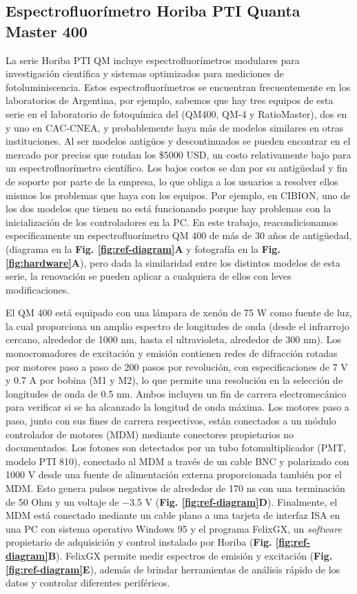 \subsection{Espectrofluorímetro Horiba PTI Quanta Master 400}

La serie Horiba PTI QM incluye espectrofluorímetros modulares para investigación científica y sistemas optimizados para mediciones de fotoluminiscencia.
Estos espectrofluorímetros se encuentran frecuentemente en los laboratorios de Argentina, por ejemplo, sabemos que hay tres equipos de esta serie en el laboratorio de fotoquímica del  (QM400, QM-4 y RatioMaster), dos en  y uno en CAC-CNEA, y probablemente haya más de modelos similares en otras instituciones.
Al ser modelos antigüos y descontinuados se pueden encontrar en el mercado por precios que rondan los \$5000 USD, un costo relativamente bajo para un espectrofluorímetro científico.
Los bajos costos se dan por su antigüedad y fin de soporte por parte de la empresa, lo que obliga a los usuarios a resolver ellos mismos los problemas que haya con los equipos.
Por ejemplo, en CIBION, uno de los dos modelos que tienen no está funcionando porque hay problemas con la inicialización de los controladores en la PC.
En este trabajo, reacondicionamos específicamente un espectrofluorímetro QM 400 de más de 30 años de antigüedad,  (diagrama en la \textbf{Fig. \ref{fig:ref-diagram}A} y fotografía en la \textbf{Fig. \ref{fig:hardware}A}), pero dada la similaridad entre los distintos modelos de esta serie, la renovación se pueden aplicar a cualquiera de ellos con leves modificaciones. 

El QM 400 está equipado con una lámpara de xenón de 75 W como fuente de luz, la cual proporciona un amplio espectro de longitudes de onda (desde el infrarrojo cercano, alrededor de 1000 nm, hasta el ultravioleta, alrededor de 300 nm).
Los monocromadores de excitación y emisión contienen redes de difracción rotadas por motores paso a paso de 200 pasos por revolución, con especificaciones de 7 V y 0.7 A por bobina (M1 y M2), lo que permite una resolución en la selección de longitudes de onda de 0.5 nm. 
Ambos incluyen un fin de carrera electromecánico para verificar si se ha alcanzado la longitud de onda máxima.
Los motores paso a paso, junto con sus fines de carrera respectivos, están conectados a un módulo controlador de motores (MDM) mediante conectores propietarios no documentados. 
Los fotones son detectados por un tubo fotomultiplicador (PMT, modelo PTI 810), conectado al MDM a través de un cable BNC y polarizado con 1000 V desde una fuente de alimentación externa proporcionada también por el MDM. 
Esto genera pulsos negativos de alrededor de 170 ns con una terminación de 50 Ohm y un voltaje de −3.5 V (\textbf{Fig. \ref{fig:ref-diagram}D}). 
Finalmente, el MDM está conectado mediante un cable plano a una tarjeta de interfaz ISA en una PC con sistema operativo Windows 95 y el programa FelixGX, un \textit{software} propietario de adquisición y control instalado por Horiba (\textbf{Fig. \ref{fig:ref-diagram}B}).
FelixGX permite medir espectros de emisión y excitación (\textbf{Fig. \ref{fig:ref-diagram}E}), además de brindar herramientas de análisis rápido de los datos y controlar diferentes periféricos.

